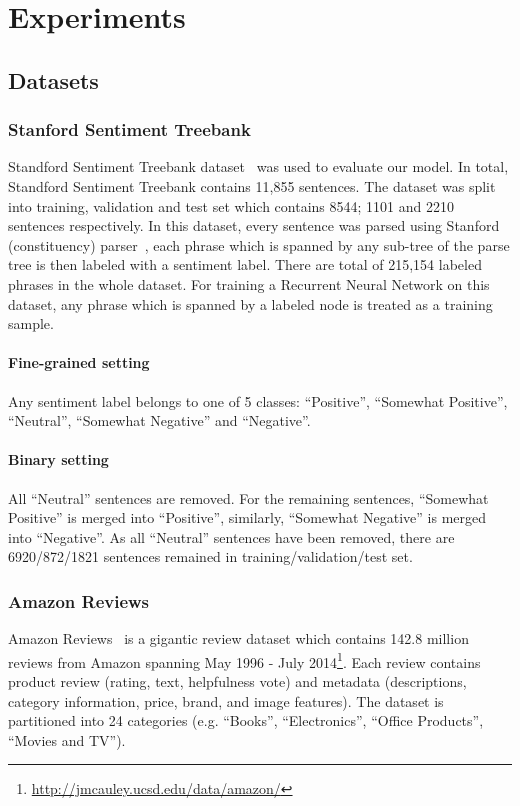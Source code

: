 \section{Experiments}
\subsection{Datasets}
\subsubsection{Stanford Sentiment Treebank} \label{sec:sst}
Standford Sentiment Treebank dataset~\cite{socher2013recursive} was used to evaluate our model.
In total, Standford Sentiment Treebank contains 11,855 sentences.
The dataset was split into training, validation and test set which contains 8544; 1101 and 2210 sentences respectively.
In this dataset, every sentence was parsed using Stanford (constituency) parser~\cite{socher2013recursive}, each phrase which is spanned by any sub-tree of the parse tree is then labeled with  a sentiment label.
There are total of 215,154 labeled phrases in the whole dataset.
For training a Recurrent Neural Network on this dataset, any phrase which is spanned by a labeled node is treated as a training sample.
\paragraph{Fine-grained setting} Any sentiment label belongs to one of 5 classes: ``Positive'', ``Somewhat Positive'', ``Neutral'', ``Somewhat Negative'' and ``Negative''.
\paragraph{Binary setting} All ``Neutral'' sentences are removed.
For the remaining sentences, ``Somewhat Positive'' is merged into ``Positive'', similarly, ``Somewhat Negative'' is merged into ``Negative''.
As all ``Neutral'' sentences have been removed, there are 6920/872/1821 sentences remained in training/validation/test set.
\subsubsection{Amazon Reviews}\label{sec:amazon}
Amazon Reviews~\cite{amazon-reviews} is a gigantic review dataset
which contains 142.8 million reviews from Amazon spanning May 1996 - July 2014\footnote{\url{http://jmcauley.ucsd.edu/data/amazon/}}.
Each review contains product review (rating, text, helpfulness vote) and metadata (descriptions, category information, price, brand, and image features).
The dataset is partitioned into 24 categories (e.g. ``Books'', ``Electronics'', ``Office Products'', ``Movies and TV'').
